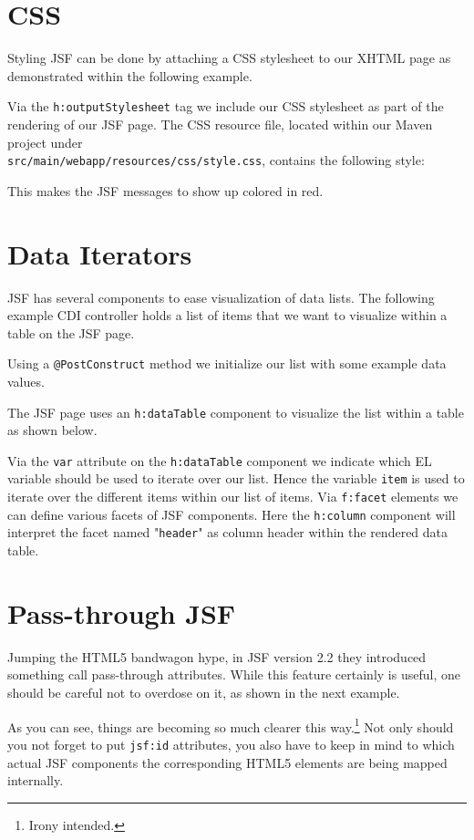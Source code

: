 \section{CSS}

Styling JSF can be done by attaching a CSS stylesheet to our XHTML page as demonstrated within the following example.

Via the \texttt{h:outputStylesheet} tag we include our CSS stylesheet as part of the rendering of our JSF page.
The CSS resource file, located within our Maven project under\\
\texttt{src/main/webapp/resources/css/style.css}, contains the following style:

This makes the JSF messages to show up colored in red.

\section{Data Iterators}

JSF has several components to ease visualization of data lists.
The following example CDI controller holds a list of items that we want to visualize within a table on the JSF page.

Using a \texttt{@PostConstruct} method we initialize our list with some example data values.

The JSF page uses an \texttt{h:dataTable} component to visualize the list within a table as shown below.

Via the \texttt{var} attribute on the \texttt{h:dataTable} component we indicate which EL variable should be used to iterate over our list.
Hence the variable \texttt{item} is used to iterate over the different items within our list of items.
Via \texttt{f:facet} elements we can define various facets of JSF components.
Here the \texttt{h:column} component will interpret the facet named "\texttt{header}" as column header within the rendered data table.

\section{Pass-through JSF}
Jumping the HTML5 bandwagon hype, in JSF version 2.2 they introduced something call pass-through attributes.
While this feature certainly is useful, one should be careful not to overdose on it, as shown in the next example.

As you can see, things are becoming so much clearer this way.\footnote{Irony intended.}
Not only should you not forget to put \texttt{jsf:id} attributes,
you also have to keep in mind to which actual JSF components the corresponding HTML5 elements are being mapped internally.

